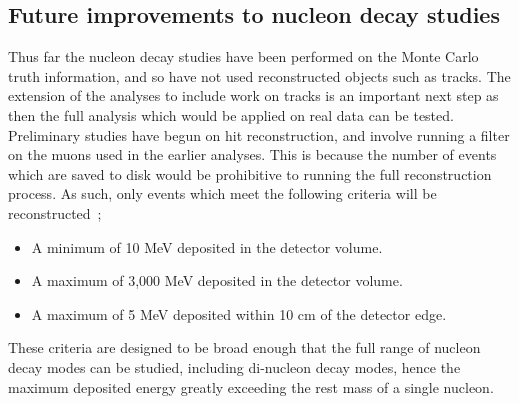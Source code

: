 \subsection{Future improvements to nucleon decay studies} \label{sec:NDKImprov}
Thus far the nucleon decay studies have been performed on the Monte Carlo truth information, and so have not used reconstructed objects such as tracks. The extension of the analyses to include work on tracks is an important next step as then the full analysis which would be applied on real data can be tested. Preliminary studies have begun on hit reconstruction, and involve running a filter on the muons used in the earlier analyses. This is because the number of events which are saved to disk would be prohibitive to running the full reconstruction process. As such, only events which meet the following criteria will be reconstructed~\citep{CosmoJanCollabMeeting};
\begin{itemize}
\item A minimum of 10 MeV deposited in the detector volume.
\item A maximum of 3,000 MeV deposited in the detector volume.
\item A maximum of 5 MeV deposited within 10 cm of the detector edge.
\end{itemize}
These criteria are designed to be broad enough that the full range of nucleon decay modes can be studied, including di-nucleon decay modes, hence the maximum deposited energy greatly exceeding the rest mass of a single nucleon. \\
